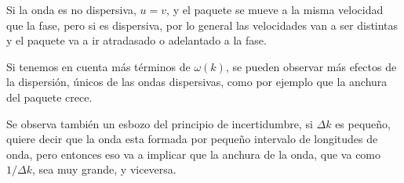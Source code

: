 Si la onda es no dispersiva, $u = v$, y el paquete se mueve a la misma velocidad que la fase, pero si es dispersiva, por lo general las velocidades van a ser distintas y el paquete va a ir atradasado o adelantado a la fase.

Si tenemos en cuenta más términos de $\omega(k)$, se pueden observar más efectos de la dispersión, únicos de las ondas dispersivas, como por ejemplo que la anchura del paquete crece.

Se observa también un esbozo del principio de incertidumbre, si $\Delta k$ es pequeño, quiere decir que la onda esta formada por pequeño intervalo de longitudes de onda, pero entonces eso va a implicar que la anchura de la onda, que va como $1/\Delta k$, sea muy grande, y viceversa.